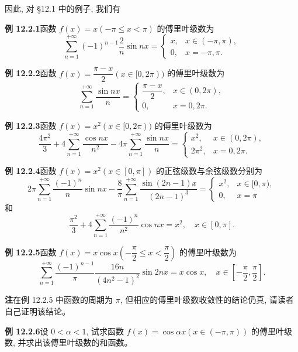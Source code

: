 \documentclass[UTF8,12pt,a4paper,fontset=fandol]{ctexart}
\begin{document}
因此, 对 \S 12.1 中的例子, 我们有

\noindent\textbf{例 12.2.1}\quad 函数 $f(x)=x(-\pi\leqslant x<\pi)$ 的傅里叶级数为
\[
  \sum_{n=1}^{+\infty}(-1)^{n-1}\frac2n\sin nx
  =
  \begin{cases}
    x, & x\in(-\pi,\pi),\\
    0, & x=-\pi,\pi.
  \end{cases}
\]

\noindent\textbf{例 12.2.2}\quad 函数 $f(x)=\dfrac{\pi-x}{2}(x\in[0,2\pi))$ 的傅里叶级数为
\[
  \sum_{n=1}^{+\infty}\frac{\sin nx}{n}
  =
  \begin{cases}
    \dfrac{\pi-x}{2}, & x\in(0,2\pi),\\
    0, & x=0,2\pi.
  \end{cases}
\]

\noindent\textbf{例 12.2.3}\quad 函数 $f(x)=x^2(x\in[0,2\pi))$ 的傅里叶级数为
\[
  \frac{4\pi^2}{3}+4\sum_{n=1}^{+\infty}\frac{\cos nx}{n^2}
  -4\pi\sum_{n=1}^{+\infty}\frac{\sin nx}{n}
  =
  \begin{cases}
    x^2, & x\in(0,2\pi),\\
    2\pi^2, & x=0,2\pi.
  \end{cases}
\]

\noindent\textbf{例 12.2.4}\quad 函数 $f(x)=x^2(x\in[0,\pi])$ 的正弦级数与余弦级数分别为
\[
  2\pi\sum_{n=1}^{+\infty}\frac{(-1)^n}{n}\sin nx
  -\frac8\pi\sum_{n=1}^{+\infty}\frac{\sin(2n-1)x}{(2n-1)^3}
  =
  \begin{cases}
    x^2, & x\in[0,\pi),\\
    0, & x=\pi
  \end{cases}
\]
和
\[
  \frac{\pi^2}{3}+4\sum_{n=1}^{+\infty}\frac{(-1)^n}{n^2}\cos nx=x^2,\quad x\in[0,\pi].
\]

\noindent\textbf{例 12.2.5}\quad 函数 $f(x)=x\cos x\left(-\dfrac{\pi}{2}\leqslant x<\dfrac{\pi}{2}\right)$ 的傅里叶级数为
\[
  \sum_{n=1}^{+\infty}\frac{(-1)^{n-1}}{\pi}\frac{16n}{(4n^2-1)^2}\sin2nx
  =x\cos x,\quad x\in\left[-\frac{\pi}{2},\frac{\pi}{2}\right].
\]

\noindent\textbf{注}\quad 在例 12.2.5 中函数的周期为 $\pi$, 但相应的傅里叶级数收敛性的结论仍真, 请读者自己证明该结论。

\noindent\textbf{例 12.2.6}\quad 设 $0<\alpha<1$, 试求函数 $f(x)=\cos\alpha x(x\in(-\pi,\pi))$ 的傅里叶级数, 并求出该傅里叶级数的和函数。
\end{document}
